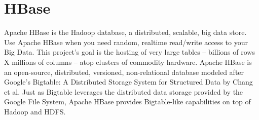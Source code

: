 \section{HBase}

Apache HBase\cite{hip-sp18-515-www-hbase} is the Hadoop database, 
a distributed, scalable, big data store. 
Use Apache HBase when you need random, realtime read/write access 
to your Big Data. This project's goal is the hosting of very large 
tables -- billions of rows X millions of columns -- atop clusters of 
commodity hardware. Apache HBase is an open-source, distributed, 
versioned, non-relational database modeled after Google's Bigtable: 
A Distributed Storage System for Structured Data by Chang et al. Just
as Bigtable leverages the distributed data storage provided by the 
Google File System, Apache HBase provides Bigtable-like capabilities 
on top of Hadoop and HDFS. 
